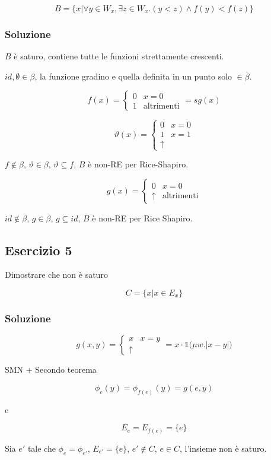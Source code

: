 $$
B = \{ x | \forall y \in W_x, \exists z \in W_x. (y < z) \wedge f(y) < f(z) \}
$$

\subsubsection{Soluzione}

$B$ è saturo, contiene tutte le funzioni strettamente crescenti.

$id, \emptyset \in \beta$, la funzione gradino e quella definita in un punto solo $\in \overline{\beta}$.

$$
f(x) = \begin{cases}
0 & x = 0 \\
1 & \text{altrimenti}
\end{cases} = sg(x)
$$

$$
\vartheta(x) = \begin{cases}
0 & x= 0 \\
1 & x = 1 \\
\uparrow 
\end{cases}
$$

$f \notin \beta$, $\vartheta \in \beta$, $\vartheta \subseteq f$, $B$ è non-RE per Rice-Shapiro.

$$
g(x) = \begin{cases}
0 & x= 0 \\
\uparrow & \text{altrimenti}
\end{cases}
$$


$id \notin \overline{\beta}$, $g \in \overline{\beta}$, $g \subseteq id$, $\overline{B}$ è non-RE per Rice Shapiro.

\subsection{Esercizio 5}

Dimostrare che non è saturo

$$
C = \{x | x \in E_x \}
$$

\subsubsection{Soluzione}

$$
g(x,y) = \begin{cases}
x & x= y \\
\uparrow
\end{cases} = x \cdot \mathbb{1}\bigg( \mu w . |x-y| \bigg)
$$

SMN + Secondo teorema

$$
\phi_e(y) = \phi_{f(e)}(y) = g(e,y)
$$

e

$$
E_e = E_{f(e)} = \{ e\}
$$

Sia $e'$ tale che $\phi_e =\phi_{e'}$, $E_{e'} = \{e\}$, $e' \notin C$, $e \in C$, l'insieme non è saturo.